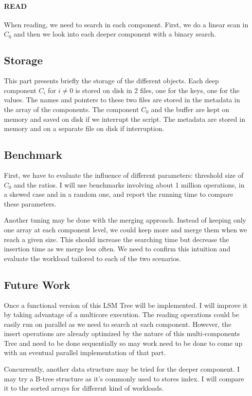 \documentclass[submit]{harvardml}
\theoremstyle{plain}
\begin{document}
\paragraph{READ}

When reading, we need to search in each component. First, we do a linear scan in $C_0$ and then we look into each deeper component with a binary search.


\subsection*{Storage}

This part presents briefly the storage of the different objects. Each deep component $C_i$ for $i \neq 0$ is stored on disk in 2 files, one for the keys, one for the values. The names and pointers to these two files are stored in the metadata in the array of the components. The component $C_0$ and the buffer are kept on memory and saved on disk if we interrupt the script. The metadata are stored in memory and on a separate file on disk if interruption.

\subsection*{Benchmark}

First, we have to evaluate the influence of different parameters: threshold size of $C_0$ and the ratios. I will use benchmarks involving about 1 million operations, in a skewed case and in a random one, and report the running time to compare these parameters.

Another tuning may be done with the merging approach. Instead of keeping only one array at each component level, we could keep more and merge them when we reach a given size. This should increase the searching time but decrease the insertion time as we merge less often. We need to confirm this intuition and evaluate the workload tailored to each of the two scenarios.

\subsection*{Future Work}

Once a functional version of this LSM Tree will be implemented. I will improve it by taking advantage of a multicore execution. The reading operations could be easily run on parallel as we need to search at each component. However, the insert operations are already optimized by the nature of this multi-components Tree and need to be done sequentially so may work need to be done to come up with an eventual parallel implementation of that part.

Concurrently, another data structure may be tried for the deeper component. I may try a B-tree structure as it's commonly used to stores index. I will compare it to the sorted arrays for different kind of workloads.
\end{document}

